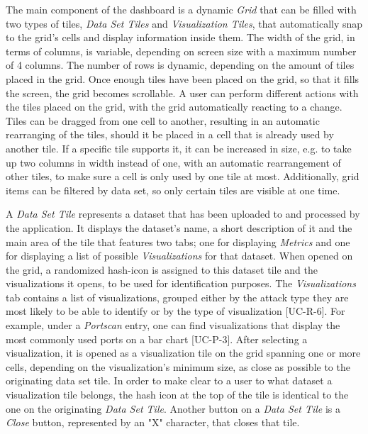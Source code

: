 The main component of the dashboard is a dynamic \emph{Grid} that can be filled with two types of tiles, \emph{Data Set Tiles} and \emph{Visualization Tiles}, that automatically snap to the grid's cells and display information inside them. The width of the grid, in terms of columns, is variable, depending on screen size with a maximum number of 4 columns. The number of rows is dynamic, depending on the amount of tiles placed in the grid. Once enough tiles have been placed on the grid, so that it fills the screen, the grid becomes scrollable.
A user can perform different actions with the tiles placed on the grid, with the grid automatically reacting to a change. Tiles can be dragged from one cell to another, resulting in an automatic rearranging of the tiles, should it be placed in a cell that is already used by another tile. If a specific tile supports it, it can be increased in size, e.g. to take up two columns in width instead of one, with an automatic rearrangement of other tiles, to make sure a cell is only used by one tile at most. Additionally, grid items can be filtered by data set, so only certain tiles are visible at one time.

A \emph{Data Set Tile} represents a dataset that has been uploaded to and processed by the application. It displays the dataset's name, a short description of it and the main area of the tile that features two tabs; one for displaying \emph{Metrics} and one for displaying a list of possible \emph{Visualizations} for that dataset. When opened on the grid, a randomized hash-icon is assigned to this dataset tile and the visualizations it opens, to be used for identification purposes. 
The \emph{Visualizations} tab contains a list of visualizations, grouped either by the attack type they are most likely to be able to identify or by the type of visualization [UC-R-6]. For example, under a \emph{Portscan} entry, one can find visualizations that display the most commonly used ports on a bar chart [UC-P-3].
After selecting a visualization, it is opened as a visualization tile on the grid spanning one or more cells, depending on the visualization’s minimum size, as close as possible to the originating data set tile. In order to make clear to a user to what dataset a visualization tile belongs, the hash icon at the top of the tile is identical to the one on the originating \emph{Data Set Tile}. Another button on a \emph{Data Set Tile} is a \emph{Close} button, represented by an "X" character, that closes that tile.

